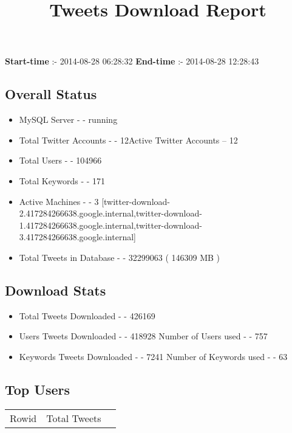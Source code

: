 \documentclass{article}\usepackage[T1]{fontenc}
\begin{document}
\title{\textbf{Tweets Download Report}}
               \date{}
                \maketitle
               \centerline{\textbf{Start-time} :- 2014-08-28 06:28:32 \hspace{40pt} \textbf{End-time} :- 2014-08-28 12:28:43}               \subsection*{Overall Status}                \begin{itemize}                \item MySQL Server - - running               \item Total Twitter Accounts - - 12\newline Active Twitter Accounts -- 12               \item Total Users - - 104966               \item Total Keywords - - 171               \item Active Machines - - 3 [twitter-download-2.417284266638.google.internal,twitter-download-1.417284266638.google.internal,twitter-download-3.417284266638.google.internal]               \item Total Tweets in Database - - 32299063 ( 146309 MB )               \end{itemize}               \subsection*{Download Stats}                \begin{itemize}                \item Total Tweets Downloaded - - 426169               \item Users Tweets Downloaded - - 418928 \newline Number of Users used - - 757               \item Keywords Tweets Downloaded - - 7241 \newline Number of Keywords used - - 63              \end{itemize}              \subsection*{Top Users}\begin{tabular}{|c|c|c|}         \hline         Rowid & Total Tweets \\ 

\end{tabular}
\end{document}
